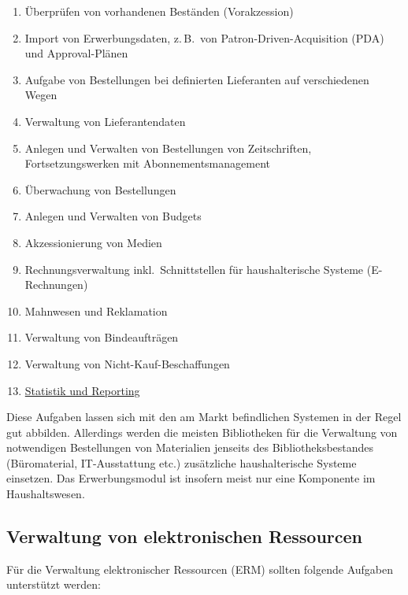 \documentclass[
  11pt,
  letterpaper,
  DIV=11,
  twoside]{scrreprt}
\begin{document}
\begin{enumerate}
\def\labelenumi{\arabic{enumi}.}
\item
  Überprüfen von vorhandenen Beständen (Vorakzession)
\item
  Import von Erwerbungsdaten, z.\,B.~von Patron-Driven-Acquisition
  ({PDA}) und Approval-Plänen
\item
  Aufgabe von Bestellungen bei definierten Lieferanten auf verschiedenen
  Wegen
\item
  Verwaltung von Lieferantendaten
\item
  Anlegen und Verwalten von Bestellungen von Zeitschriften,
  Fortsetzungswerken mit Abonnementsmanagement
\item
  Überwachung von Bestellungen
\item
  Anlegen und Verwalten von Budgets
\item
  Akzessionierung von Medien
\item
  Rechnungsverwaltung inkl.~Schnittstellen für haushalterische Systeme
  (E-Rechnungen)
\item
  Mahnwesen und Reklamation
\item
  Verwaltung von Bindeaufträgen
\item
  Verwaltung von Nicht-Kauf-Beschaffungen
\item
  \hyperref[statistik-und-reporting]{Statistik und Reporting}
\end{enumerate}

Diese Aufgaben lassen sich mit den am Markt befindlichen Systemen in der
Regel gut abbilden. Allerdings werden die meisten Bibliotheken für die
Verwaltung von notwendigen Bestellungen von Materialien jenseits des
Bibliotheksbestandes (Büromaterial, IT-Ausstattung etc.) zusätzliche
haushalterische Systeme einsetzen. Das Erwerbungsmodul ist insofern
meist nur eine Komponente im Haushaltswesen.

\subsection{Verwaltung von elektronischen
Ressourcen}\label{verwaltung-von-elektronischen-ressourcen}

Für die Verwaltung elektronischer Ressourcen ({ERM}) sollten folgende
Aufgaben unterstützt werden:
\end{document}
